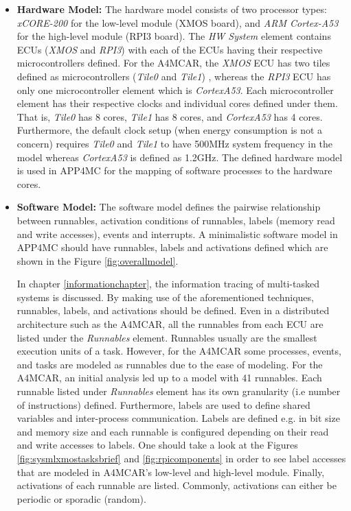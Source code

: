 \begin{itemize}
	\item \textbf{Hardware Model:} The hardware model consists of two processor types: \textit{xCORE-200} for the low-level module (XMOS board), and \textit{ARM Cortex-A53} for the high-level module (RPI3 board). The \textit{HW System} element contains ECUs (\textit{XMOS} and \textit{RPI3}) with each of the ECUs having their respective microcontrollers defined. For the A4MCAR, the \textit{XMOS} ECU has two tiles defined as microcontrollers (\textit{Tile0} and \textit{Tile1}) , whereas the \textit{RPI3} ECU has only one microcontroller element which is \textit{CortexA53}. Each microcontroller element has their respective clocks and individual cores defined under them. That is, \textit{Tile0} has 8 cores, \textit{Tile1} has 8 cores, and \textit{CortexA53} has 4 cores. Furthermore, the default clock setup (when energy consumption is not a concern) requires \textit{Tile0} and \textit{Tile1} to have 500MHz system frequency in the model whereas \textit{CortexA53} is defined as 1.2GHz. The defined hardware model is used in APP4MC for the mapping of software processes to the hardware cores.
	\item \textbf{Software Model:} The software model defines the pairwise relationship between runnables, activation conditions of runnables, labels (memory read and write accesses), events and interrupts. A minimalistic software model in APP4MC should have runnables, labels and activations defined which are shown in the Figure \ref{fig:overallmodel}. 
	
	In chapter \ref{informationchapter}, the information tracing of multi-tasked systems is discussed. By making use of the aforementioned techniques, runnables, labels, and activations should be defined. Even in a distributed architecture such as the A4MCAR, all the runnables from each ECU are listed under the \textit{Runnables} element. Runnables usually are the smallest execution units of a task. However, for the A4MCAR some processes, events, and tasks are modeled as runnables due to the ease of modeling. For the A4MCAR, an initial analysis led up to a model with 41 runnables. Each runnable listed under \textit{Runnables} element has its own granularity (i.e number of instructions) defined. Furthermore, labels are used to define shared variables and inter-process communication. Labels are defined e.g. in bit size and memory size and each runnable is configured depending on their read and write accesses to labels. One should take a look at the Figures \ref{fig:sysmlxmostasksbrief} and \ref{fig:rpicomponents} in order to see label accesses that are modeled in A4MCAR's low-level and high-level module. Finally, activations of each runnable are listed. Commonly, activations can either be periodic or sporadic (random).
	

\end{itemize}
